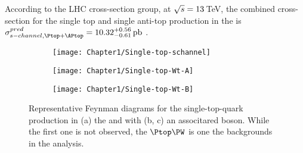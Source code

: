 According to the LHC cross-section group, at $\sqrt{s}=13\,$TeV, the combined 
cross-section for the single top and single anti-top production in the \schannel 
is $\sigma^{pred}_{\schannel, \Ptop + \APtop} = 10.32^{+0.56}_{-0.61} \,\textrm{pb}$ 
\cite{Kant:2014oha}.


\begin{figure}
     \centering
     \begin{subfigure}[b]{0.3\textwidth}
         \centering
         \texttt{[image: Chapter1/Single-top-schannel]}
         \caption{}
         \label{fig:Chap1:top:singletop:schannel}
     \end{subfigure}
     \begin{subfigure}[b]{0.3\textwidth}
         \centering
         \texttt{[image: Chapter1/Single-top-Wt-A]}
         \caption{}
         \label{fig:Chap1:top:singletop:tW_A}
     \end{subfigure}
     \begin{subfigure}[b]{0.3\textwidth}
         \centering
         \texttt{[image: Chapter1/Single-top-Wt-B]}
         \caption{}
         \label{fig:Chap1:top:singletop:tW_B}
     \end{subfigure}
        \caption{Representative Feynman diagrams for the single-top-quark production in (a) the \schannel
        and with (b, c) an associtared \PW boson. While the first one is not observed, the $\Ptop\PW$ is one the backgrounds
        in the \tHq analysis.}
        \label{fig:Chap1:top:singletop:SchannelAndAssocited}
\end{figure}


